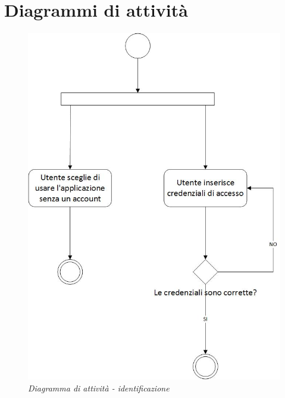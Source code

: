 \newpage
\chapter{Diagrammi di attività}
\label{cap:Diagrammi di attività}

	\begin{figure}[ht]
		\centering
		\includegraphics[scale=0.35]{immagini/analisi/001_identificazione.jpg}
		\caption{\textit{Diagramma di attività - identificazione}}
	\end{figure}\FloatBarrier
	
